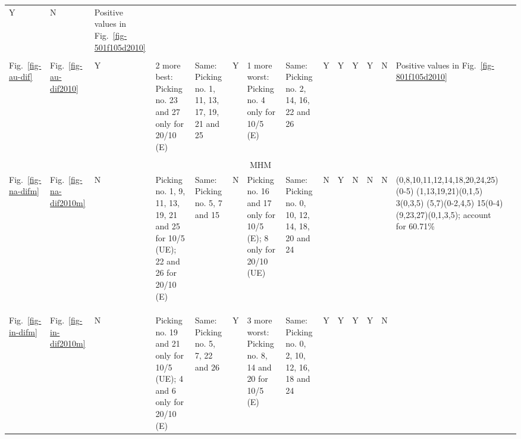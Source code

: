 \begin{table*}
{\begin{tabular}{l|l|l|l|p{2cm}|l|p{2.4cm}|l|lllllll}
  \multicolumn{1}{l|}{Y} & \multicolumn{1}{l|}{N} &
  \multicolumn{1}{l|}{\multirow{2}{*}{\parbox{3cm}{Positive values in Fig.~\ref{fig-501f105d2010}}}} &
  \\ \\ \\ \hline
Fig.~\ref{fig-au-dif} & Fig.~\ref{fig-au-dif2010} & Y &
  \multirow{2}{*}{\parbox{2.5cm}{2 more best: Picking no. 23 and 27 only for 20/10 (E)}} &
  \multirow{2}{*}{\parbox{2cm}{Same: Picking no. 1, 11, 13, 17, 19, 21 and 25}} &
  Y & \multirow{2}{*}{\parbox{2.4cm}{1 more worst: Picking no. 4 only for 10/5 (E)}} &
  \multirow{2}{*}{\parbox{2cm}{Same: Picking no. 2, 14, 16, 22 and 26}} &
  \multicolumn{1}{l|}{Y} & \multicolumn{1}{l|}{Y} & \multicolumn{1}{l|}{Y} &
  \multicolumn{1}{l|}{Y} & \multicolumn{1}{l|}{N} &
  \multicolumn{1}{l|}{\multirow{2}{*}{\parbox{3cm}{Positive values in Fig.~\ref{fig-801f105d2010}}}} &
  \\ \\ \\ \hline
\multicolumn{15}{c}{MHM} \\ \hline
Fig.~\ref{fig-na-difm} & Fig.~\ref{fig-na-dif2010m} & N &
  \multirow{2}{*}{\parbox{2.5cm}{Picking no. 1, 9, 11, 13, 19, 21 and 25 for 10/5 (UE);
  22 and 26 for 20/10 (E)}} &
  \multirow{2}{*}{\parbox{2cm}{Same: Picking no. 5, 7 and 15}} & N &
  \multirow{2}{*}{\parbox{2.4cm}{Picking no. 16 and 17 only for 10/5 (E); 8 only for 20/10 (UE)}} &
  \multirow{2}{*}{\parbox{2cm}{Same: Picking no. 0, 10, 12, 14, 18, 20 and 24}} &
  \multicolumn{1}{l|}{N} & \multicolumn{1}{l|}{Y} & \multicolumn{1}{l|}{N} &
  \multicolumn{1}{l|}{N} & \multicolumn{1}{l|}{N} &
  \multicolumn{1}{l|}{\multirow{2}{*}{\parbox{3cm}{(0,8,10,11,12,14,18,20,24,25)(0-5)
  (1,13,19,21)(0,1,5) 3(0,3,5) (5,7)(0-2,4,5) 15(0-4) (9,23,27)(0,1,3,5);
  account for 60.71\%}}} & \\ \\ \\ \\ \\ \hline
Fig.~\ref{fig-in-difm} & Fig.~\ref{fig-in-dif2010m} & N &
  \multirow{2}{*}{\parbox{2.5cm}{Picking no. 19 and 21 only for 10/5 (UE); 4
  and 6 only for 20/10 (E)}} &
  \multirow{2}{*}{\parbox{2cm}{Same: Picking no. 5, 7, 22 and 26}} &
  Y & \multirow{2}{*}{\parbox{2.4cm}{3 more worst: Picking no. 8, 14 and 20 for 10/5 (E)}} &
  \multirow{2}{*}{\parbox{2cm}{Same: Picking no. 0, 2, 10, 12, 16, 18 and 24}} &
  \multicolumn{1}{l|}{Y} & \multicolumn{1}{l|}{Y} & \multicolumn{1}{l|}{Y} &
  \multicolumn{1}{l|}{Y} & \multicolumn{1}{l|}{N} &

\end{tabular}}
\end{table*}
